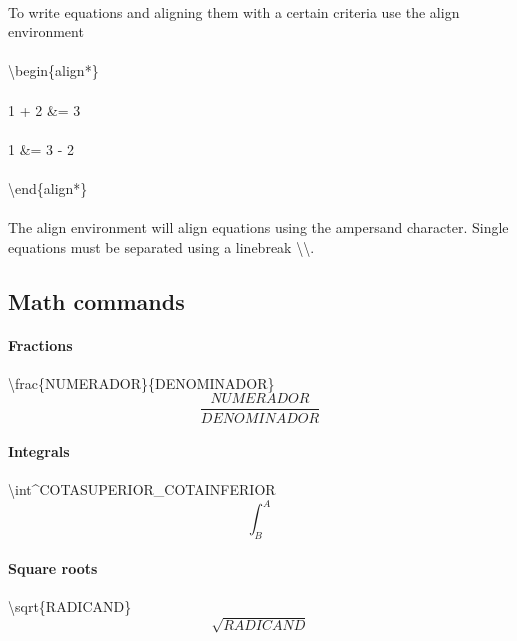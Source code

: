 \documentclass{article}
\begin{document}
{\paragraph{}
To write equations and aligning them with a certain criteria use the align environment
\paragraph{}
\textbackslash begin\{align*\}
\paragraph{}
  1 + 2 \&= 3\\
\paragraph{}
  1 \&= 3 - 2
\paragraph{}
\textbackslash end\{align*\}

\paragraph{}
The align environment will align equations using the ampersand character. Single equations must be separated using a linebreak \textbackslash \textbackslash .

\subsection{Math commands}
\paragraph{Fractions}
\textbackslash frac\{NUMERADOR\}\{DENOMINADOR\}
\begin{equation*}
	\frac{NUMERADOR}{DENOMINADOR}
\end{equation*}

\paragraph{Integrals}
\textbackslash int\textasciicircum COTASUPERIOR\_COTAINFERIOR
\begin{equation*}
	\int^A_B
\end{equation*}

\paragraph{Square roots}
\textbackslash sqrt\{RADICAND\}
\begin{equation*}
	\sqrt{RADICAND}
\end{equation*}

}
\end{document}
